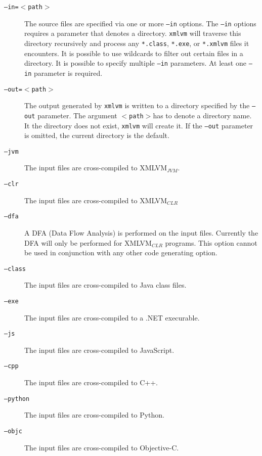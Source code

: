 \documentclass[12pt]{article}
\newcommand{\xmlvm}{\texttt{xmlvm} }
\begin{document}
\begin{description}

\item[\texttt{--in=$<$path$>$}] The source files are specified via one
  or more \texttt{--in} options. The \texttt{--in} options requires a
  parameter that denotes a directory. \xmlvm will traverse this
  directory recursively and process any \texttt{*.class},
  \texttt{*.exe}, or \texttt{*.xmlvm} files it encounters. It is
  possible to use wildcards to filter out certain files in a
  directory. It is possible to specify multiple \texttt{--in}
  parameters. At least one \texttt{--in} parameter is required.

\item[\texttt{--out=$<$path$>$}] The output generated by \xmlvm is
  written to a directory specified by the \texttt{--out} parameter.
  The argument \texttt{$<$path$>$}has to denote a directory name. It
  the directory does not exist, \xmlvm will create it. If the
  \texttt{--out} parameter is omitted, the current directory is the
  default.

\item[\texttt{--jvm}] The input files are cross-compiled to
  XMLVM$_{JVM}$.

\item[\texttt{--clr}] The input files are cross-compiled to
  XMLVM$_{CLR}$

\item[\texttt{--dfa}] A DFA (Data Flow Analysis) is performed on the
  input files. Currently the DFA will only be performed for
  XMLVM$_{CLR}$ programs. This option cannot be used in conjunction
  with any other code generating option.

\item[\texttt{--class}] The input files are cross-compiled to Java
  class files.

\item[\texttt{--exe}] The input files are cross-compiled to a .NET
  execurable.

\item[\texttt{--js}] The input files are cross-compiled to JavaScript.

\item[\texttt{--cpp}] The input files are cross-compiled to C++.

\item[\texttt{--python}] The input files are cross-compiled to Python.

\item[\texttt{--objc}] The input files are cross-compiled to
  Objective-C.


\end{description}
\end{document}
